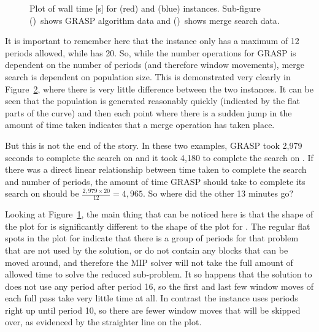 \documentclass[preprint]{elsarticle}
\begin{document}
\begin{figure}[h!]
    \centering
    \begin{subfigure}[t]{0.45\textwidth}
    \centering
    \caption{}
    \label{plot:time.1}
    \end{subfigure}
    \qquad
    \begin{subfigure}[t]{0.45\textwidth}
    \centering
    \caption{}
    \label{plot:time.2}
    \end{subfigure}
    \caption[Plot of wall time {[s]} for \zucksmall{} and \dmine{} instances]{Plot of wall time [s] for \zucksmall{} (red) and \dmine{} (blue) instances. Sub-figure ()~shows GRASP algorithm data and ()~shows merge search data.}
    \label{plot:mine:time}
\end{figure}
%

It is important to remember here that the \dmine{} instance only has a maximum of 12 periods allowed, while \zucksmall{} has 20. So, while the number operations for GRASP is dependent on the number of periods (and therefore window movements), merge search is dependent on population size. This is demonstrated very clearly in Figure~\ref{plot:time.2}, where there is very little difference between the two instances. It can be seen that the population is generated reasonably quickly (indicated by the flat parts of the curve) and then each point where there is a sudden jump in the amount of time taken indicates that a merge operation has taken place.


But this is not the end of the story. In these two examples, GRASP took 2,979 seconds to complete the search on \dmine{} and it took 4,180 to complete the search on \zucksmall{}. If there was a direct linear relationship between time taken to complete the search and number of periods, the amount of time GRASP should take to complete its search on \zucksmall{} should be \(\frac{2,979\times20}{12} = 4,965\). So where did the other 13 minutes go?

Looking at Figure~\ref{plot:time.1}, the main thing that can be noticed here is that the shape of the plot for \zucksmall{} is significantly different to the shape of the plot for \dmine{}. The regular flat spots in the plot for \zucksmall{} indicate that there is a group of periods for that problem that are not used by the solution, or do not contain any blocks that can be moved around, and therefore the MIP solver will not take the full amount of allowed time to solve the reduced sub-problem. It so happens that the solution to \zucksmall{} does not use any period after period 16, so the first and last few window moves of each full pass take very little time at all. In contrast the \dmine{} instance uses periods right up until period 10, so there are fewer window moves that will be skipped over, as evidenced by the straighter line on the plot.
\end{document}
